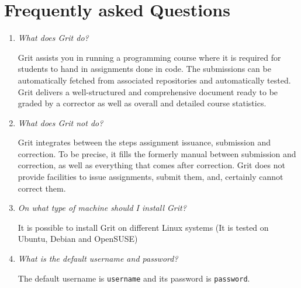 \documentclass[10pt,a4paper, titlepage, toc=idx]{scrreprt}
\theoremstyle{definition}
\theoremstyle{plain}
\newcommand*{\product}{Grit}
\begin{document}
	\chapter{Frequently asked Questions}
	\begin{enumerate}
        \item \textit{What does \product{} do?}
		
          \product{}  assists you in running a programming course where
          it is required for students to hand in assignments done in
          code. The submissions can be automatically fetched from
          associated repositories and automatically tested. \product{} 
          delivers a well-structured and comprehensive document ready
          to be graded by a corrector as well as overall and detailed
          course statistics.
		
        \item \textit{What does \product{} not do?}
		
          \product{}  integrates between the steps assignment issuance,
          submission and correction. To be precise, it fills the
          formerly manual between submission and correction, as well
          as everything that comes after correction. \product{} does not
          provide facilities to issue assignments, submit them, and,
          certainly cannot correct them.
		
        \item \textit{On what type of machine should I install
            \product?}
		
          It is possible to install \product{} on different Linux systems (It is tested on Ubuntu, Debian and OpenSUSE)
		
		
          
		
		
        \item \textit{What is the default username and password?}
		
          The default username is {\tt username} and its password is
          {\tt password}.
		

\end{enumerate}
\end{document}
